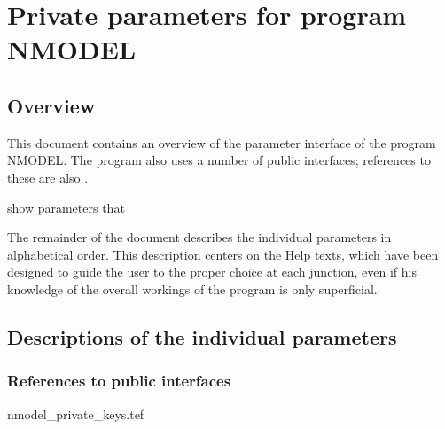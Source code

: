 
\chapter{ Private parameters for program NMODEL}
\tableofcontents


\section{ Overview}

	This document contains an overview of the parameter interface of the
program NMODEL. The program also uses a number of public interfaces; references
to these are also .

show %
parameters that %


	The remainder of the document describes the individual parameters in
alphabetical order. This description centers on the Help texts, which have been
designed to guide the user to the proper choice at each junction, even if his
knowledge of the overall workings of the program is only superficial.


\section{ Descriptions of the individual parameters}
\label{.descriptions}

\subsection{ References to public interfaces}
\label{.public}

 {nmodel_private_keys.tef}
